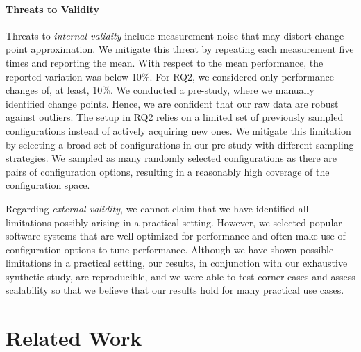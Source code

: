 \documentclass[sigconf]{acmart}
\begin{document}
	\paragraph{Threats to Validity}
	Threats to \emph{internal validity} include measurement noise that may distort change point approximation. We mitigate this threat by repeating each measurement five times and reporting the mean. With respect to the mean performance, the reported variation was below 10\%. For RQ2, we considered only performance changes of, at least, 10\%. We conducted a pre-study, where we manually identified change points.
	Hence, we are confident that our raw data are robust against outliers. The setup in RQ2 relies on a limited set of previously sampled configurations instead of actively acquiring new ones. We mitigate this limitation by selecting a broad set of configurations in our pre-study with different sampling strategies. We sampled as many randomly selected configurations as there are pairs of configuration options, resulting in a reasonably high coverage of the configuration space. 
	
	Regarding \emph{external validity}, we cannot claim that we have identified all limitations possibly arising in a practical setting. However, we selected popular software systems that are well optimized for performance and often make use of configuration options to tune performance.  Although we have shown possible limitations in a practical setting, our results, in conjunction with our exhaustive synthetic study, are reproducible, and we were able to test corner cases and assess scalability so that we believe that our results hold for many practical use cases.
	
	\section{Related Work}\label{sec:rw}
\end{document}
